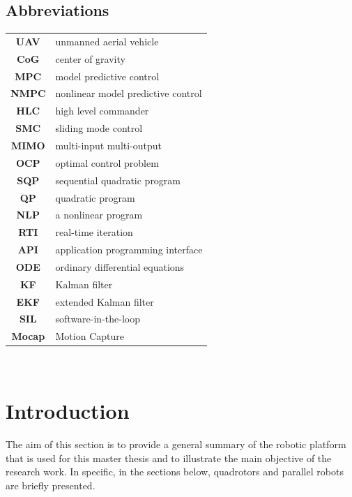 \documentclass{thesisreport}
\begin{document}
  \section*{Abbreviations}
 \begin{tabular}{cp{}}
  \textbf{UAV} & unmanned aerial vehicle \\
  \textbf{CoG} & center of gravity \\
  \textbf{MPC} & model predictive control \\
  \textbf{NMPC} & nonlinear model predictive control \\
  \textbf{HLC} & high level commander \\
  \textbf{SMC} & sliding mode control \\
  \textbf{MIMO} & multi-input multi-output \\
  \textbf{OCP} & optimal control problem \\
  \textbf{SQP} & sequential quadratic program \\
  \textbf{QP} & quadratic program \\
  \textbf{NLP} & a nonlinear program \\
  \textbf{RTI} & real-time iteration \\
  \textbf{API} & application programming interface \\
  \textbf{ODE} & ordinary differential equations \\
  \textbf{KF} & Kalman filter \\
  \textbf{EKF} & extended Kalman filter \\
  \textbf{SIL} & software-in-the-loop \\
  \textbf{Mocap} & Motion Capture \\
  
  
 \end{tabular}\\
 \newpage
 
 \listoffigures
 
\listoftables
 
 \tableofcontents
 
 
 \chapter*{Introduction}
 The aim of this section is to provide a general summary of the robotic platform that is used for this master thesis and to illustrate the main objective of the research work.
In specific, in the sections below, quadrotors and parallel robots are briefly presented.
\end{document}
